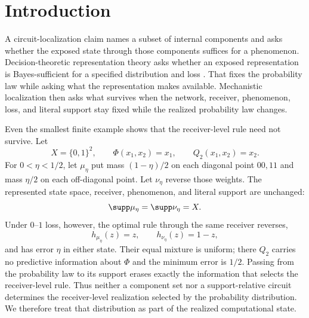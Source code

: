 \section{Introduction}
\label{sec:introduction}

A circuit-localization claim names a subset of internal components and asks whether the exposed state through those components suffices for a phenomenon. Decision-theoretic representation theory asks whether an exposed representation is Bayes-sufficient for a specified distribution and loss \citep{sevetlidis2026bayes}. That fixes the probability law while asking what the representation makes available. Mechanistic localization then asks what survives when the network, receiver, phenomenon, loss, and literal support stay fixed while the realized probability law changes.

Even the smallest finite example shows that the receiver-level rule need not survive. Let
\[
X=\{0,1\}^2,\qquad
\Phi(x_1,x_2)=x_1,\qquad
Q_2(x_1,x_2)=x_2.
\]
For $0<\eta<1/2$, let $\mu_\eta$ put mass $(1-\eta)/2$ on each diagonal point $00,11$ and mass $\eta/2$ on each off-diagonal point. Let $\nu_\eta$ reverse those weights. The represented state space, receiver, phenomenon, and literal support are unchanged:
\[
\supp\mu_\eta=\supp\nu_\eta=X.
\]
Under $0$--$1$ loss, however, the optimal rule through the same receiver reverses,
\[
h_{\mu_\eta}(z)=z,\qquad h_{\nu_\eta}(z)=1-z,
\]
and has error $\eta$ in either state. Their equal mixture is uniform; there $Q_2$ carries no predictive information about $\Phi$ and the minimum error is $1/2$. Passing from the probability law to its support erases exactly the information that selects the receiver-level rule. Thus neither a component set nor a support-relative circuit determines the receiver-level realization selected by the probability distribution. We therefore treat that distribution as part of the realized computational state.

